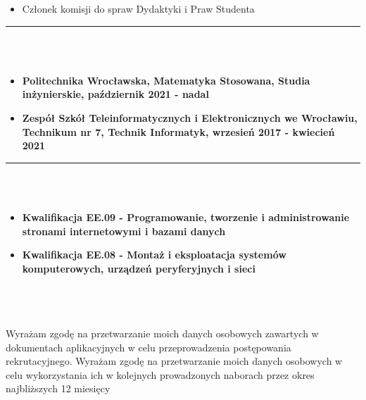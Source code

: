 \documentclass[10pt]{article}
\begin{document}
\begin{minipage}[t]{0.60\textwidth}
\begin{itemize}[leftmargin=*]
            \item Członek komisji do spraw Dydaktyki i Praw Studenta
        \end{itemize}
        \rule{11cm}{1pt} \\ \\
        \fontsize{10pt}{10pt}
        \begin{itemize}[leftmargin=*]
            \setlength{\parskip}{0pt}
            \item \textbf{Politechnika Wrocławska, Matematyka Stosowana, Studia \\ inżynierskie, październik 2021 - nadal}
            \item \textbf{Zespół Szkół Teleinformatycznych i Elektronicznych we Wrocławiu, Technikum nr 7, Technik Informatyk, wrzesień 2017 - kwiecień 2021} 
        \end{itemize}
        \rule{11cm}{1pt} \\ \\
        \fontsize{10pt}{10pt}
        \begin{itemize}[leftmargin=*]
            \setlength{\parskip}{0pt}
            \item \textbf{Kwalifikacja EE.09 - Programowanie, tworzenie i administrowanie stronami
            internetowymi i bazami danych}
            \item \textbf{Kwalifikacja EE.08 - Montaż i eksploatacja systemów komputerowych, urządzeń
            peryferyjnych i sieci}
        \end{itemize}
        \rule{0pt}{0pt} \\ \\ \\
        \fontsize{7pt}{5pt}\selectfont  
        Wyrażam zgodę na przetwarzanie moich danych osobowych zawartych w dokumentach aplikacyjnych w
        celu przeprowadzenia postępowania rekrutacyjnego.
        Wyrażam zgodę na przetwarzanie moich danych osobowych w celu wykorzystania ich w kolejnych
        prowadzonych naborach przez okres najbliższych 12 miesięcy
    \end{minipage}
\end{document}
